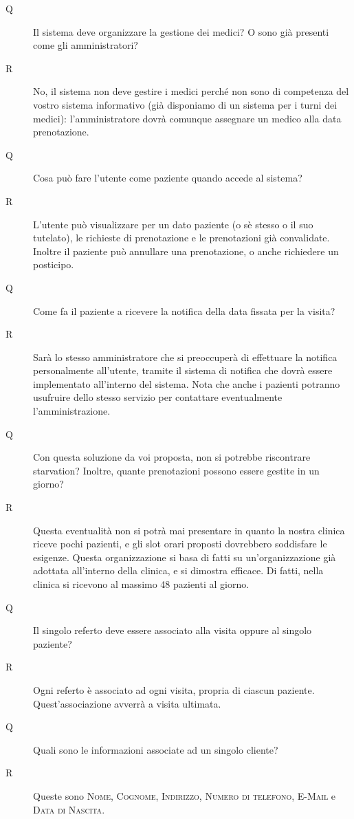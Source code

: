 \begin{description}
\item[Q] Il sistema deve organizzare la gestione dei medici? O sono già presenti come gli amministratori?
\item[R] No, il sistema non deve gestire i medici perché non sono di competenza del vostro sistema informativo (già disponiamo di un sistema per i turni dei medici): l'amministratore dovrà comunque assegnare un medico alla data prenotazione.
\medskip

\item[Q] Cosa può fare l'utente come paziente quando accede al sistema?
\item[R] L'utente può visualizzare per un dato paziente (o sè stesso o il suo tutelato), 
le richieste di prenotazione e le prenotazioni già convalidate.
Inoltre il paziente può annullare una prenotazione, o anche richiedere un posticipo.
\medskip

\item[Q] Come fa il paziente a ricevere la notifica della data fissata per la visita?
\item[R] Sarà lo stesso amministratore che si preoccuperà di effettuare la notifica personalmente all'utente, tramite il sistema di notifica che dovrà essere implementato all'interno del sistema. 
Nota che anche i pazienti potranno usufruire dello stesso servizio per contattare eventualmente l'amministrazione.
\medskip


\item[Q] Con questa soluzione da voi proposta, non si potrebbe riscontrare starvation? Inoltre, quante prenotazioni possono essere gestite in un giorno?
\item[R] Questa eventualità non si potrà mai presentare in quanto la nostra clinica riceve pochi pazienti, e gli slot orari proposti dovrebbero soddisfare le esigenze. Questa organizzazione si basa di fatti su un'organizzazione già adottata all'interno della clinica, e si dimostra efficace. Di fatti, nella clinica si ricevono al massimo 48 pazienti al giorno.
\medskip


\item[Q] Il singolo referto deve essere associato alla visita oppure al singolo paziente?
\item[R] Ogni referto è associato ad ogni visita, propria di ciascun paziente. Quest'associazione avverrà a visita ultimata.
\medskip


\item[Q] Quali sono le informazioni associate ad un singolo cliente?
\item[R] Queste sono \textsc{Nome, Cognome, Indirizzo, Numero di telefono, E-Mail} e 
\textsc{Data di Nascita}. 
\medskip 


\end{description}
